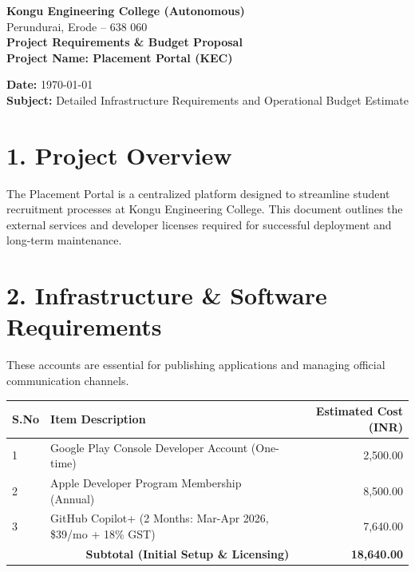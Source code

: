 \documentclass[12pt,a4paper]{article}
\begin{document}
\begin{center}
    {\LARGE \textbf{Kongu Engineering College (Autonomous)}} \\
    \vspace{0.2cm}
    {\large Perundurai, Erode -- 638 060} \\
    \vspace{0.8cm}
    {\Large \textbf{Project Requirements \& Budget Proposal}} \\
    \vspace{0.3cm}
    {\large \textbf{Project Name: Placement Portal (KEC)}} \\
\end{center}

\vspace{0.5cm}

\noindent \textbf{Date:} \today \\
\textbf{Subject:} Detailed Infrastructure Requirements and Operational Budget Estimate

\vspace{0.5cm}

\section*{1. Project Overview}
The Placement Portal is a centralized platform designed to streamline student recruitment processes at Kongu Engineering College. This document outlines the external services and developer licenses required for successful deployment and long-term maintenance.

\section*{2. Infrastructure \& Software Requirements}

These accounts are essential for publishing applications and managing official communication channels.

\vspace{0.3cm}
\noindent
\renewcommand{\arraystretch}{1.5}
\begin{tabular}{|l|p{8cm}|r|}
\hline
\textbf{S.No} & \textbf{Item Description} & \textbf{Estimated Cost (INR)} \\ \hline
1 & Google Play Console Developer Account (One-time) & 2,500.00 \\ \hline
2 & Apple Developer Program Membership (Annual) & 8,500.00 \\ \hline
3 & GitHub Copilot+ (2 Months: Mar-Apr 2026, \$39/mo + 18\% GST) & 7,640.00 \\ \hline
\multicolumn{2}{|r|}{\textbf{Subtotal (Initial Setup \& Licensing)}} & \textbf{18,640.00} \\ \hline
\end{tabular}
\vspace{0.3cm}
\end{document}
